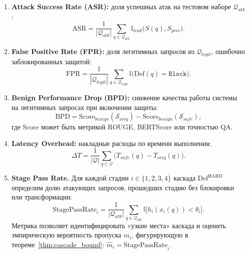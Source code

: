 \documentclass[12pt, a4paper]{article}
\theoremstyle{definition}
\theoremstyle{remark}
\begin{document}
\begin{enumerate}
    \item \textbf{Attack Success Rate (ASR):} доля успешных атак на тестовом наборе $\mathcal{Q}_{atk}$:
    \begin{equation}
        \label{eq:asr}
        \mathrm{ASR} = \frac{1}{|\mathcal{Q}_{atk}|} \sum_{q \in \mathcal{Q}_{atk}} \mathbb{I}_{leak}\bigl(S(q), S_{priv}\bigr).
    \end{equation}

    \item \textbf{False Positive Rate (FPR):} доля легитимных запросов из $\mathcal{Q}_{legit}$, ошибочно заблокированных защитой:
    \begin{equation}
        \label{eq:fpr}
        \mathrm{FPR} = \frac{1}{|\mathcal{Q}_{legit}|} \sum_{q \in \mathcal{Q}_{legit}} \mathbb{I}\bigl(\mathrm{Def}(q) = \texttt{Block}\bigr).
    \end{equation}

    \item \textbf{Benign Performance Drop (BPD):} снижение качества работы системы на легитимных запросах при включении защиты:
    \begin{equation}
        \label{eq:bpd}
        \mathrm{BPD} = \mathrm{Score}_{benign}(\mathcal{S}_{orig}) - \mathrm{Score}_{benign}(\mathcal{S}_{safe}),
    \end{equation}
    где $\mathrm{Score}$ может быть метрикой ROUGE, BERTScore или точностью QA.

    \item \textbf{Latency Overhead:} накладные расходы по времени выполнения:
    \begin{equation}
        \label{eq:latency}
        \Delta T = \frac{1}{|\mathcal{Q}|} \sum_{q \in \mathcal{Q}} \bigl(T_{safe}(q) - T_{orig}(q)\bigr).
    \end{equation}

    \item \textbf{Stage Pass Rate.} Для каждой стадии $i \in \{1, 2, 3, 4\}$ каскада $\mathrm{Def}^{\text{HARD}}$ определим долю атакующих запросов, прошедших стадию без блокировки или трансформации:
    \begin{equation}
        \label{eq:stage_pass}
        \mathrm{StagePassRate}_i =
        \frac{1}{|\mathcal{Q}_{atk}|}
        \sum_{q \in \mathcal{Q}_{atk}}
        \mathbb{I}\bigl[h_i(x_i(q)) < \theta_i\bigr].
    \end{equation}
    Метрика позволяет идентифицировать «узкие места» каскада и оценить эмпирическую вероятность пропуска $m_i$, фигурирующую в теореме~\ref{thm:cascade_bound}: $\widehat{m}_i = \mathrm{StagePassRate}_i$.


\end{enumerate}
\end{document}
